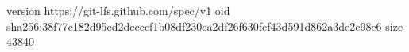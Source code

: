 version https://git-lfs.github.com/spec/v1
oid sha256:38f77c182d95ed2dcccef1b08df230ca2df26f630fcf43d591d862a3de2c98e6
size 43840
